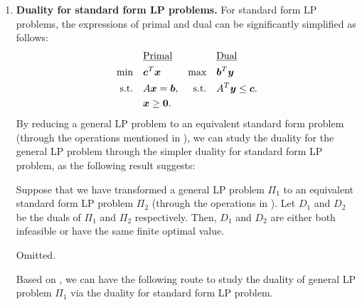 \begin{enumerate}
\begin{enumerate}[label={(\arabic*)}]
\end{enumerate}
\item \textbf{Duality for standard form LP problems.} For standard form
LP problems, the expressions of primal and dual can be significantly simplified
as follows:
\begin{align*}
&\text{\underline{Primal}}&&\text{\underline{Dual}} \\
\text{min}\quad&\bm{c}^{T}\bm{x}&\text{max}\quad&\bm{b}^{T}\bm{y} \\
\text{s.t.}\quad&A\bm{x}=\bm{b},&\text{s.t.}\quad&A^{T}\bm{y}\le\bm{c}. \\
\quad&\bm{x}\ge\bm{0}.
\end{align*}
By reducing a general LP problem to an equivalent standard form problem
(through the operations mentioned in ), we can
study the duality for the general LP problem through the simpler duality for
standard form LP problem, as the following result suggests:

\begin{theorem}
\label{thm:dual-equiv}
Suppose that we have transformed a general LP problem \(\Pi_1\) to an
equivalent standard form LP problem \(\Pi_2\) (through the operations in
).  Let \(D_1\) and \(D_2\) be the duals of
\(\Pi_1\) and \(\Pi_2\) respectively.  Then, \(D_1\) and \(D_2\) are either
both infeasible or have the same finite optimal value.
\end{theorem}
\begin{pf}
Omitted.
\end{pf}

Based on , we can have the following route to study the
duality of general LP problem \(\Pi_1\) via the duality for standard form
LP problem.
\begin{center}
\end{center}
\end{enumerate}
